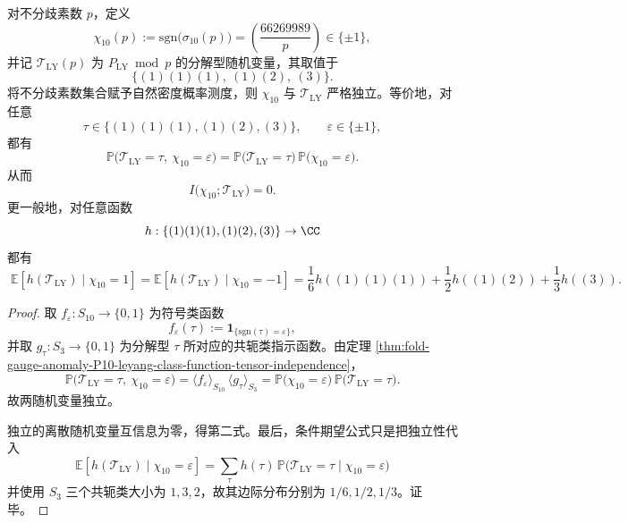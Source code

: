 \begin{corollary}\label{cor:fold-gauge-anomaly-P10-leyang-zero-mutual-information}
对不分歧素数 \(p\)，定义
\[
\chi_{10}(p):=\mathrm{sgn}\!\bigl(\sigma_{10}(p)\bigr)
=
\left(\frac{66269989}{p}\right)\in\{\pm 1\},
\]
并记 \(\mathcal T_{\mathrm{LY}}(p)\) 为 \(P_{\mathrm{LY}}\bmod p\) 的分解型随机变量，其取值于
\[
\{(1)(1)(1),\ (1)(2),\ (3)\}.
\]
将不分歧素数集合赋予自然密度概率测度，则 \(\chi_{10}\) 与 \(\mathcal T_{\mathrm{LY}}\) 严格独立。等价地，对任意
\[
\tau\in\{(1)(1)(1),(1)(2),(3)\},
\qquad
\varepsilon\in\{\pm 1\},
\]
都有
\[
\boxed{\;
\mathbb{P}\!\bigl(\mathcal T_{\mathrm{LY}}=\tau,\ \chi_{10}=\varepsilon\bigr)
=
\mathbb{P}\!\bigl(\mathcal T_{\mathrm{LY}}=\tau\bigr)\,
\mathbb{P}\!\bigl(\chi_{10}=\varepsilon\bigr).\;}
\]
从而
\[
\boxed{\;
I\!\bigl(\chi_{10};\mathcal T_{\mathrm{LY}}\bigr)=0.\;}
\]
更一般地，对任意函数
\[
h:\{(1)(1)(1),(1)(2),(3)\}\to\CC
\]
都有
\[
\boxed{\;
\mathbb{E}\!\left[h(\mathcal T_{\mathrm{LY}})\mid \chi_{10}=1\right]
=
\mathbb{E}\!\left[h(\mathcal T_{\mathrm{LY}})\mid \chi_{10}=-1\right]
=
\frac16 h((1)(1)(1))+\frac12 h((1)(2))+\frac13 h((3)).\;}
\]
\end{corollary}
\begin{proof}
取 \(f_\varepsilon:S_{10}\to\{0,1\}\) 为符号类函数
\[
f_\varepsilon(\tau):=\mathbf 1_{\{\mathrm{sgn}(\tau)=\varepsilon\}},
\]
并取 \(g_\tau:S_3\to\{0,1\}\) 为分解型 \(\tau\) 所对应的共轭类指示函数。由定理
\ref{thm:fold-gauge-anomaly-P10-leyang-class-function-tensor-independence}，
\[
\mathbb{P}\!\bigl(\mathcal T_{\mathrm{LY}}=\tau,\ \chi_{10}=\varepsilon\bigr)
=
\langle f_\varepsilon\rangle_{S_{10}}\,
\langle g_\tau\rangle_{S_3}
=
\mathbb{P}\!\bigl(\chi_{10}=\varepsilon\bigr)\,
\mathbb{P}\!\bigl(\mathcal T_{\mathrm{LY}}=\tau\bigr).
\]
故两随机变量独立。

独立的离散随机变量互信息为零，得第二式。最后，条件期望公式只是把独立性代入
\[
\mathbb{E}\!\left[h(\mathcal T_{\mathrm{LY}})\mid \chi_{10}=\varepsilon\right]
=
\sum_{\tau}h(\tau)\,
\mathbb{P}\!\bigl(\mathcal T_{\mathrm{LY}}=\tau\mid \chi_{10}=\varepsilon\bigr)
\]
并使用 \(S_3\) 三个共轭类大小为 \(1,3,2\)，故其边际分布分别为 \(1/6,1/2,1/3\)。证毕。
\end{proof}

